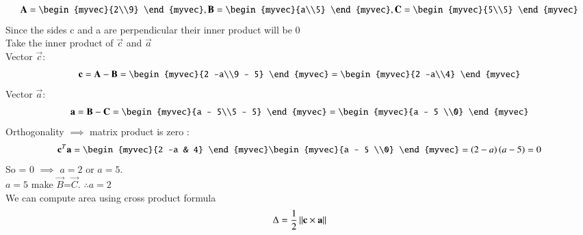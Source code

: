 \documentclass[journal]{IEEEtran}
\begin{document}
	\begin{align}
		\vec{A} = \begin{myvec}{2\\9} \end{myvec} , \vec{B} = \begin{myvec}{a\\5} \end{myvec}, \vec{C} = \begin{myvec}{5\\5} \end{myvec}
	\end{align}
	Since the sides c and a are perpendicular their inner product will be 0\\
	Take the inner product of $\vec{c}$ and $\vec{a}$\\
	Vector $\vec{c}$:
	\begin{align}
		\vec{c} = \vec{A}-\vec{B} = \begin{myvec}{2 -a\\9 - 5} \end{myvec} = \begin{myvec}{2 -a\\4} \end{myvec}
	\end{align}
	Vector $\vec{a}$:
	\begin{align}
		\vec{a} = \vec{B}-\vec{C} = \begin{myvec}{a - 5\\5 - 5} \end{myvec} = \begin{myvec}{a - 5 \\0} \end{myvec}
	\end{align}
	Orthogonality $\implies$ matrix product is zero :
	\begin{align}
	\vec{c}^T\vec{a} = \begin{myvec}{2 -a & 4} \end{myvec}\begin{myvec}{a - 5 \\0} \end{myvec} = \brak{2-a}\brak{a-5} = 0
	\end{align}
	So  = 0 $\implies$ $a = 2$ or $a = 5$.\\
	$a = 5$ make $\vec{B}$=$\vec{C}$. $\therefore a =2$  \\
	We can compute area using cross product formula
	\begin{align}
		\Delta = \frac{1}{2}\left\lVert\mathbf{c}\times\mathbf{a}\right\rVert \label{eq:0.5}
	\end{align}
\end{document}
